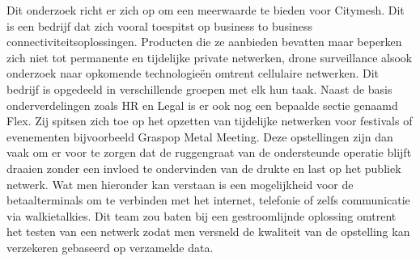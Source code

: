 Dit onderzoek richt er zich op om een meerwaarde te bieden voor Citymesh. Dit is een bedrijf dat zich vooral toespitst op business to business connectiviteitsoplossingen. Producten die ze aanbieden bevatten maar beperken zich niet tot permanente en tijdelijke private netwerken, drone surveillance alsook onderzoek naar opkomende technologieën omtrent cellulaire netwerken. Dit bedrijf is opgedeeld in verschillende groepen met elk hun taak. Naast de basis onderverdelingen zoals HR en Legal is er ook nog een bepaalde sectie genaamd Flex. Zij spitsen zich toe op het opzetten van tijdelijke netwerken voor festivals of evenementen bijvoorbeeld Graspop Metal Meeting. Deze opstellingen zijn dan vaak om er voor te zorgen dat de ruggengraat van de ondersteunde operatie blijft draaien zonder een invloed te ondervinden van de drukte en last op het publiek netwerk. Wat men hieronder kan verstaan is een mogelijkheid voor de betaalterminals om te verbinden met het internet, telefonie of zelfs communicatie via walkietalkies. Dit team zou baten bij een gestroomlijnde oplossing omtrent het testen van een netwerk zodat men versneld de kwaliteit van de opstelling kan verzekeren gebaseerd op verzamelde data.

\section{}%
\label{sec:onderzoeksvraag}



\section{}%
\label{sec:onderzoeksdoelstelling}


